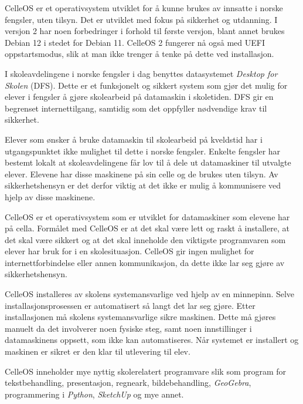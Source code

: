 \vfill\eject

\topglue 1pc

CelleOS er et operativsystem utviklet for \aa{} kunne brukes av innsatte i norske fengsler, uten tilsyn. Det er utviklet med fokus p\aa{} sikkerhet og utdanning. I versjon 2 har noen forbedringer i forhold til første versjon, blant annet brukes Debian 12 i stedet for Debian 11. CelleOS  2 fungerer nå også med UEFI oppstartsmodus, slik at man ikke trenger å tenke på dette ved installasjon.


I skoleavdelingene i norske fengsler i dag benyttes datasystemet {\it Desktop for Skolen} (DFS). Dette er et funksjonelt og sikkert system som gj\o r det mulig for elever i fengsler \aa{} gj\o re skolearbeid p\aa{} datamaskin i skoletiden. DFS gir en begrenset internettilgang, samtidig som det oppfyller n\o dvendige krav til sikkerhet.

Elever som \o nsker \aa{} bruke datamaskin til skolearbeid p\aa{} kveldstid har i utgangspunktet ikke mulighet til dette i norske fengsler. Enkelte fengsler har bestemt lokalt at skoleavdelingene f\aa r lov til \aa{} dele ut datamaskiner til utvalgte elever. Elevene har disse maskinene p\aa{} sin celle og de brukes uten tilsyn. Av sikkerhetshensyn er det derfor viktig at det ikke er mulig \aa{} kommunisere ved hjelp av disse maskinene.

CelleOS er et operativsystem som er utviklet for datamaskiner som elevene har p\aa{} cella. Form\aa let med CelleOS er at det skal v\ae re lett og raskt \aa{} installere, at det skal v\ae re sikkert og at det skal inneholde den viktigste programvaren som elever har bruk for i en skolesituasjon. CelleOS gir ingen mulighet for internettforbindelse eller annen kommunikasjon, da dette ikke lar seg gj\o re av sikkerhetshensyn.


CelleOS installeres av skolens systemansvarlige ved hjelp av en minnepinn. Selve installasjonsprosessen er automatisert s\aa{} langt det lar seg gj\o re. Etter installasjonen m\aa{} skolens systemansvarlige sikre maskinen. Dette m\aa{} gj\o res manuelt da det involverer noen fysiske steg, samt noen innstillinger i datamaskinens oppsett, som ikke kan automatiseres. N\aa r systemet er installert og maskinen er sikret er den klar til utlevering til elev.

CelleOS inneholder mye nyttig skolerelatert programvare slik som program for tekstbehandling, presentasjon, regneark, bildebehandling, {\it GeoGebra}, programmering i {\it Python}, {\it SketchUp} og mye annet.

